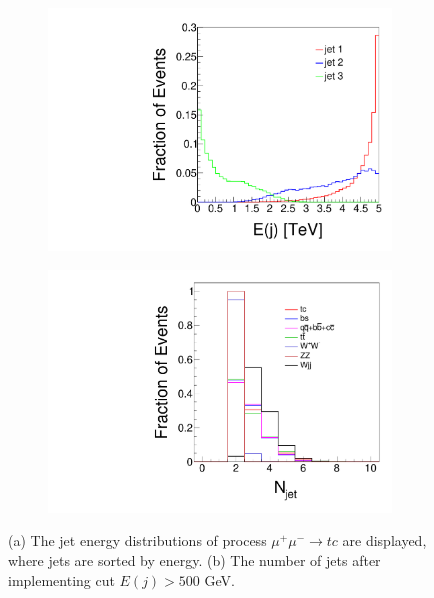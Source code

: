 \documentclass[a4paper,11pt]{article}
\begin{document}
\begin{figure}[htbp]
  \centering
  \captionsetup[sub]{font=large}
  \begin{subfigure}[t]{0.45\textwidth}
     \includegraphics[width=\linewidth]{ej_tc.pdf}
     \caption{}
     \label{subfig:ej_tc}
  \end{subfigure}
  \begin{subfigure}[t]{0.45\textwidth}
     \includegraphics[width=\linewidth]{njets.pdf}
     \caption{}
     \label{subfig:njets}
  \end{subfigure}
  \caption{(a) The jet energy distributions of process $\mu^+\mu^-\to tc$ are displayed, where jets are sorted by energy. (b) The number of jets after implementing cut $E(j)>500$ GeV.}\label{fig:base}
\end{figure}
\end{document}
